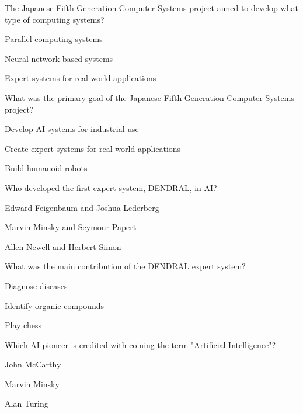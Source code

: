 \begin{enhancedmcq}{The Japanese Fifth Generation Computer Systems project aimed to develop what type of computing systems?}
\item Parallel computing systems
\item Neural network‑based systems
\item Expert systems for real‑world applications

\end{enhancedmcq}
\begin{enhancedmcq}{What was the primary goal of the Japanese Fifth Generation Computer Systems project?}
\item Develop AI systems for industrial use
\item Create expert systems for real‑world applications
\item Build humanoid robots

\end{enhancedmcq}
\begin{enhancedmcq}{Who developed the first expert system, DENDRAL, in AI?}
\item Edward Feigenbaum and Joshua Lederberg
\item Marvin Minsky and Seymour Papert
\item Allen Newell and Herbert Simon

\end{enhancedmcq}
\begin{enhancedmcq}{What was the main contribution of the DENDRAL expert system?}
\item Diagnose diseases
\item Identify organic compounds
\item Play chess

\end{enhancedmcq}
\begin{enhancedmcq}{Which AI pioneer is credited with coining the term "Artificial Intelligence"?}
\item John McCarthy
\item Marvin Minsky
\item Alan Turing
\end{enhancedmcq}